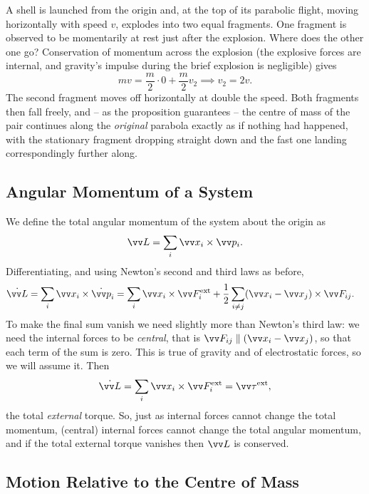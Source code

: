 \begin{example}
	A shell is launched from the origin and, at the top of its parabolic flight, moving horizontally with speed $v$, explodes into two equal fragments. One fragment is observed to be momentarily at rest just after the explosion. Where does the other one go? Conservation of momentum across the explosion (the explosive forces are internal, and gravity's impulse during the brief explosion is negligible) gives
	$$
	m v = \frac{m}{2}\cdot 0 + \frac{m}{2}v_2 \implies v_2 = 2v.
	$$
	The second fragment moves off horizontally at double the speed. Both fragments then fall freely, and -- as the proposition guarantees -- the centre of mass of the pair continues along the \emph{original} parabola exactly as if nothing had happened, with the stationary fragment dropping straight down and the fast one landing correspondingly further along.
\end{example}

\subsection{Angular Momentum of a System}

We define the total angular momentum of the system about the origin as
$$
\vv L = \sum_i \vv x_i \times \vv p_i.
$$
Differentiating, and using Newton's second and third laws as before,
\begin{align*}
	\dot{\vv L} &= \sum_i \vv x_i \times \dot{\vv p}_i = \sum_i \vv x_i \times \vv F_i^{\text{ext}} + \frac{1}{2}\sum_{i \neq j} (\vv x_i - \vv x_j) \times \vv F_{ij}.
\end{align*}
To make the final sum vanish we need slightly more than Newton's third law: we need the internal forces to be \emph{central}, that is $\vv F_{ij} \parallel (\vv x_i - \vv x_j)$, so that each term of the sum is zero. This is true of gravity and of electrostatic forces, so we will assume it. Then
$$
\dot{\vv L} = \sum_i \vv x_i \times \vv F_i^{\text{ext}} = \vv \tau^{\text{ext}},
$$
the total \emph{external} torque. So, just as internal forces cannot change the total momentum, (central) internal forces cannot change the total angular momentum, and if the total external torque vanishes then $\vv L$ is conserved.

\subsection{Motion Relative to the Centre of Mass}

